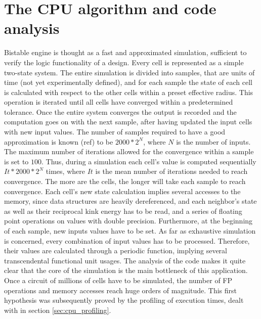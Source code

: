 \section{The CPU algorithm and code analysis}\label{sec:cpu_algorithm}
Bistable engine is thought as a fast and approximated simulation, sufficient to verify the logic functionality of a design. 
Every cell is represented as a simple two-state system. The entire simulation is divided into samples, that are units of time 
(not yet experimentally defined), and for each sample the state of each cell is calculated with respect to the other cells within 
a preset effective radius. This operation is iterated until all cells have converged within a predetermined tolerance. 
Once the entire system converges the output is recorded and the computation goes on with the next sample, after having updated
 the input cells with new input values.
The number of samples required to have a good approximation is known (ref) to be $2000*2^N$, where $N$ is the number of inputs.
 The maximum number of iterations allowed for the convergence within a sample is set to $100$. Thus, during a simulation each cell's value 
is computed sequentially $It*2000*2^N$ times, where $It$ is the mean number of iterations needed to reach convergence. 
The more are the cells, the longer will take each sample to reach convergence. Each cell's new state calculation implies several accesses to the memory, since data structures are heavily dereferenced, and each neighbor's state as well as their reciprocal kink energy has to be read, and a series of floating point operations on values with double precision. Furthermore, at the beginning of each sample, new inputs values have to be set. As far as exhaustive simulation is concerned, every combination of input values has to be processed. Therefore, their values are calculated through a periodic function, implying several transcendental functional unit usages.\newline
The analysis of the code makes it quite clear that the core of the simulation is the main bottleneck of this application. Once a circuit of millions of cells have to be simulated, the number of FP operations and memory accesses reach huge orders of magnitude. This first hypothesis was subsequently proved by the profiling of execution times, dealt with in section \ref{sec:cpu_profiling}.

